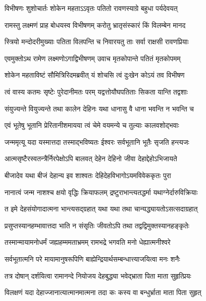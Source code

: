 \twolineshloka
{विभीषणः शुशोचार्तः शोकेन महताऽऽवृतः}
{पतितो रावणस्याग्रे बहुधा पर्यदेवयत्} %

\twolineshloka
{रामस्तु लक्ष्मणं प्राह बोधयस्व विभीषणम्}
{करोतु भ्रातृसंस्कारं किं विलम्बेन मानद} %

\twolineshloka
{स्त्रियो मन्दोदरीमुख्याः पतिता विलपन्ति च}
{निवारयतु ताः सर्वा राक्षसी रावणप्रियाः} %

\twolineshloka
{एवमुक्तोऽथ रामेण लक्ष्मणोऽगाद्विभीषणम्}
{उवाच मृतकोपान्ते पतितं मृतकोपमम्} %

\twolineshloka
{शोकेन महताविष्टं सौमित्रिरिदमब्रवीत्}
{यं शोचसि त्वं दुःखेन कोऽयं तव विभीषण} %

\twolineshloka
{त्वं वास्य कतमः सृष्टेः पुरेदानीमतः परम्}
{यद्वत्तोयौघपतिताः सिकता यान्ति तद्वशाः} %

\twolineshloka
{संयुज्यन्ते वियुज्यन्ते तथा कालेन देहिनः}
{यथा धानासु वै धाना भवन्ति न भवन्ति च} %

\twolineshloka
{एवं भूतेषु भूतानि प्रेरितानीशमायया}
{त्वं चेमे वयमन्ये च तुल्याः कालवशोद्भवाः} %

\twolineshloka
{जन्ममृत्यू यदा यस्मात्तदा तस्माद्भविष्यतः}
{ईश्वरः सर्वभूतानि भूतैः सृजति हन्त्यजः} %

\twolineshloka
{आत्मसृष्टैरस्वतन्त्रैर्निरपेक्षोऽपि बालवत्}
{देहेन देहिनो जीवा देहाद्देहोऽभिजायते} %

\twolineshloka
{बीजादेव यथा बीजं देहान्य इव शाश्वतः}
{देहिदेहविभागोऽयमविवेककृतः पुरा} %

\twolineshloka
{नानात्वं जन्म नाशश्च क्षयो वृद्धिः क्रियाफलम्}
{द्रष्टुराभान्त्यतद्धर्मा यथाग्नेर्दारुविक्रियाः} %

\twolineshloka
{त इमे देहसंयोगादात्मना भान्त्यसद्ग्रहात्}
{यथा यथा तथा चान्यद्ध्यायतोऽसत्सदाग्रहात्} %

\twolineshloka
{प्रसुप्तस्यानहम्भावात्तदा भाति न संसृतिः}
{जीवतोऽपि तथा तद्वद्विमुक्तस्यानहङ्कृतेः} %

\twolineshloka
{तस्मान्मायामनोधर्मं जह्यहम्ममताभ्रमम्}
{रामभद्रे भगवति मनो धेह्यात्मनीश्वरे} %

\twolineshloka
{सर्वभूतात्मनि परे मायामानुषरूपिणि}
{बाह्येन्द्रियार्थसम्बन्धात्त्याजयित्वा मनः शनैः} %

\twolineshloka
{तत्र दोषान् दर्शयित्वा रामानन्दे नियोजय}
{देहबुद्ध्या भवेद्भ्राता पिता माता सुहृत्प्रियः} %

\twolineshloka
{विलक्षणं यदा देहाज्जानात्यात्मानमात्मना}
{तदा कः कस्य वा बन्धुर्भ्राता माता पिता सुहृत्} %

